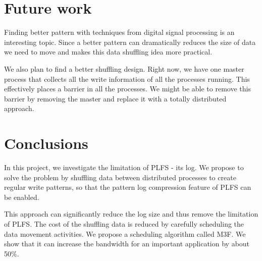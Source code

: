 \documentclass{acm_proc_article-sp}
\begin{document}
\section{Future work}
\label{sec:future-work}
Finding better pattern with techniques
from digital signal processing is an interesting
topic. Since a better pattern can dramatically
reduces the size of data we need
to move and makes this data shuffling
idea more practical. 

We also plan to find a better shuffling
design. Right now, we have one master process
that collects all the write information of all
the processes running. This effectively
places a barrier in all the processes. We
might be able to remove this barrier by
removing the master and replace it with a
totally distributed approach.


\section{Conclusions}
\label{sec:conclusions}
In this project, we investigate
the limitation of PLFS - its log.
We propose to solve the problem
by shuffling data between
distributed processes to create 
regular write patterns, so that
the pattern log compression feature
of PLFS can be enabled. 

This approach can significantly
reduce the log size and thus remove
the limitation of PLFS. The cost
of the shuffling data is reduced
by carefully scheduling the data movement
activities. We propose a scheduling
algorithm called M3F. We show
that it can increase the bandwidth
for an important application by about 50\%.





  
\end{document}
